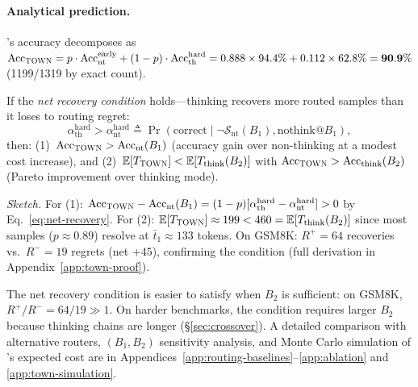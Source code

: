 \paragraph{Analytical prediction.}
\method{}'s accuracy decomposes as
$\textrm{Acc}_{\textsc{TOWN}{}} = p \cdot \textrm{Acc}_{\textrm{nt}}^{\textrm{early}} + (1 - p) \cdot \textrm{Acc}_{\textrm{th}}^{\textrm{hard}}
= 0.888 \times 94.4\% + 0.112 \times 62.8\% = \mathbf{90.9\%}$ (1199/1319 by exact count).

\begin{proposition}
\label{thm:town-pareto}
If the \emph{net recovery condition} holds---thinking recovers more routed samples than it loses to routing regret:
\begin{equation}
  \alpha_{\mathrm{th}}^{\mathrm{hard}}
  > \alpha_{\mathrm{nt}}^{\mathrm{hard}}
  \triangleq \Pr(\text{correct} \mid \neg\mathcal{S}_{\mathrm{nt}}(B_1), \text{nothink@}B_1),
  \label{eq:net-recovery}
\end{equation}
then: (1)~$\mathrm{Acc}_{\textsc{TOWN}{}} > \mathrm{Acc}_{\mathrm{nt}}(B_1)$ (accuracy gain over non-thinking at a modest cost increase), and (2)~$\mathbb{E}[T_{\textsc{TOWN}{}}] < \mathbb{E}[T_{\mathrm{think}}(B_2)]$ with $\mathrm{Acc}_{\textsc{TOWN}{}} > \mathrm{Acc}_{\mathrm{think}}(B_2)$ (Pareto improvement over thinking mode).
\end{proposition}

\noindent\emph{Sketch.}
For (1): $\mathrm{Acc}_{\textsc{TOWN}{}} - \mathrm{Acc}_{\mathrm{nt}}(B_1) = (1-p)[\alpha_{\mathrm{th}}^{\mathrm{hard}} - \alpha_{\mathrm{nt}}^{\mathrm{hard}}] > 0$ by Eq.~\eqref{eq:net-recovery}.
For (2): $\mathbb{E}[T_{\textsc{TOWN}{}}] \approx 199 < 460 = \mathbb{E}[T_{\mathrm{think}}(B_2)]$ since most samples ($p \approx 0.89$) resolve at $\bar{t}_1 \approx 133$ tokens.
On GSM8K: $R^+ = 64$ recoveries vs.\ $R^- = 19$ regrets (net $+45$), confirming the condition (full derivation in Appendix~\ref{app:town-proof}).

\noindent
The net recovery condition is easier to satisfy when $B_2$ is sufficient: on GSM8K, $R^+/R^- = 64/19 \gg 1$.
On harder benchmarks, the condition requires larger $B_2$ because thinking chains are longer (\S\ref{sec:crossover}).
A detailed comparison with alternative routers, $(B_1, B_2)$ sensitivity analysis, and Monte Carlo simulation of \method{}'s expected cost are in Appendices~\ref{app:routing-baselines}--\ref{app:ablation} and \ref{app:town-simulation}.
